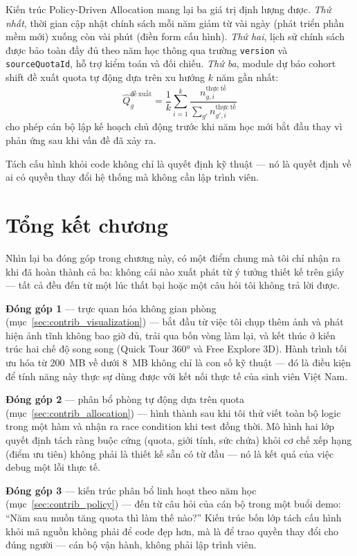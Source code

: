 \documentclass[../DoAn.tex]{subfiles}
\begin{document}
Kiến trúc Policy-Driven Allocation mang lại ba giá trị định lượng được.
\textit{Thứ nhất}, thời gian cập nhật chính sách mỗi năm giảm từ vài ngày
(phát triển phần mềm mới) xuống còn vài phút (điền form cấu hình). \textit{Thứ
hai}, lịch sử chính sách được bảo toàn đầy đủ theo năm học thông qua trường
\texttt{version} và \texttt{sourceQuotaId}, hỗ trợ kiểm toán và đối chiếu.
\textit{Thứ ba}, module dự báo cohort shift đề xuất quota tự động dựa trên
xu hướng $k$ năm gần nhất:
\begin{equation}
\hat{Q}_g^{\mathrm{đề\ xuất}} = \frac{1}{k} \sum_{i=1}^{k}
    \frac{n_{g,i}^{\mathrm{thực\ tế}}}{\displaystyle\sum_{g'} n_{g',i}^{\mathrm{thực\ tế}}}
\label{eq:quota_recommendation}
\end{equation}
cho phép cán bộ lập kế hoạch chủ động trước khi năm học mới bắt đầu thay vì
phản ứng sau khi vấn đề đã xảy ra.

Tách cấu hình khỏi code không chỉ là quyết định kỹ thuật --- nó là quyết định
về ai có quyền thay đổi hệ thống mà không cần lập trình viên.

\section{Tổng kết chương}
\label{sec:contrib_summary}

Nhìn lại ba đóng góp trong chương này, có một điểm chung mà tôi chỉ nhận ra
khi đã hoàn thành cả ba: không cái nào xuất phát từ ý tưởng thiết kế trên giấy
--- tất cả đều đến từ một lúc thất bại hoặc một câu hỏi tôi không trả lời được.

\textbf{Đóng góp 1} --- trực quan hóa không gian phòng
(mục~\ref{sec:contrib_visualization}) --- bắt đầu từ việc tôi chụp thêm ảnh
và phát hiện ảnh tĩnh không bao giờ đủ, trải qua bốn vòng làm lại, và kết
thúc ở kiến trúc hai chế độ song song (Quick Tour 360° và Free Explore 3D).
Hành trình tối ưu hóa từ 200~MB về dưới 8~MB không chỉ là con số kỹ thuật
--- đó là điều kiện để tính năng này thực sự dùng được với kết nối thực tế
của sinh viên Việt Nam.

\textbf{Đóng góp 2} --- phân bổ phòng tự động dựa trên quota
(mục~\ref{sec:contrib_allocation}) --- hình thành sau khi tôi thử viết toàn
bộ logic trong một hàm và nhận ra race condition khi test đồng thời. Mô hình
hai lớp quyết định tách ràng buộc cứng (quota, giới tính, sức chứa) khỏi cơ
chế xếp hạng (điểm ưu tiên) không phải là thiết kế sẵn có từ đầu --- nó là
kết quả của việc debug một lỗi thực tế.

\textbf{Đóng góp 3} --- kiến trúc phân bổ linh hoạt theo năm học
(mục~\ref{sec:contrib_policy}) --- đến từ câu hỏi của cán bộ trong một buổi
demo: ``Năm sau muốn tăng quota thì làm thế nào?'' Kiến trúc bốn lớp tách cấu
hình khỏi mã nguồn không phải để code đẹp hơn, mà là để trao quyền thay đổi
cho đúng người --- cán bộ vận hành, không phải lập trình viên.
\end{document}
